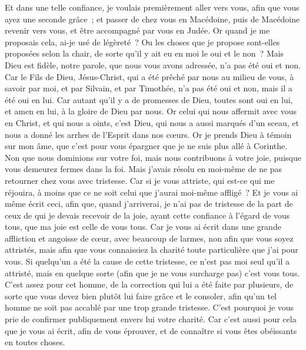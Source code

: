 \begin{multicols}{2}
Et dans une telle confiance, je voulais premièrement aller vers vous, afin que vous ayez une seconde grâce~;
et passer de chez vous en Macédoine, puis de Macédoine revenir vers vous, et être accompagné par vous en Judée.
Or quand je me proposais cela, ai-je usé de légèreté~? Ou les choses que je propose sont-elles proposées selon la chair, de sorte qu'il y ait eu en moi le oui et le non~?
Mais Dieu est fidèle, notre parole, que nous vous avons adressée, n'a pas été oui et non.
Car le Fils de Dieu, Jésus-Christ, qui a été prêché par nous au milieu de vous, à savoir par moi, et par Silvain, et par Timothée, n'a pas été oui et non, mais il a été oui en lui.
Car autant qu'il y a de promesses de Dieu, toutes sont oui en lui, et amen en lui, à la gloire de Dieu par nous.
Or celui qui nous affermit avec vous en Christ, et qui nous a oints, c'est Dieu,
qui nous a aussi marqués d'un sceau, et nous a donné les arrhes de l'Esprit dans nos cœurs.
Or je prends Dieu à témoin sur mon âme, que c'est pour vous épargner que je ne suis plus allé à Corinthe.
Non que nous dominions sur votre foi, mais nous contribuons à votre joie, puisque vous demeurez fermes dans la foi.
\VerseOne{}Mais j'avais résolu en moi-même de ne pas retourner chez vous avec tristesse.
Car si je vous attriste, qui est-ce qui me réjouira, à moins que ce ne soit celui que j'aurai moi-même affligé~?
Et je vous ai même écrit ceci, afin que, quand j'arriverai, je n'ai pas de tristesse de la part de ceux de qui je devais recevoir de la joie, ayant cette confiance à l'égard de vous tous, que ma joie est celle de vous tous.
Car je vous ai écrit dans une grande affliction et angoisse de cœur, avec beaucoup de larmes, non afin que vous soyez attristés, mais afin que vous connaissiez la charité toute particulière que j'ai pour vous.
Si quelqu'un a été la cause de cette tristesse, ce n'est pas moi seul qu'il a attristé, mais en quelque sorte (afin que je ne vous surcharge pas) c'est vous tous.
C'est assez pour cet homme, de la correction qui lui a été faite par plusieurs,
de sorte que vous devez bien plutôt lui faire grâce et le consoler, afin qu'un tel homme ne soit pas accablé par une trop grande tristesse.
C'est pourquoi je vous prie de confirmer publiquement envers lui votre charité.
Car c'est aussi pour cela que je vous ai écrit, afin de vous éprouver, et de connaître si vous êtes obéissants en toutes choses.

\end{multicols}
